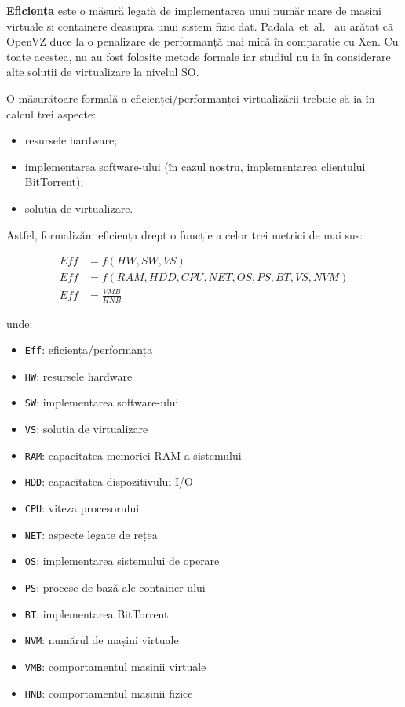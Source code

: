 \textbf{Eficiența} este o măsură legată de implementarea unui număr mare
de mașini virtuale și containere deasupra unui sistem fizic dat.
Padala~et~al.~\cite{eval-virt-performance} au arătat că OpenVZ duce la
o penalizare de performanță mai mică în comparație cu Xen. Cu toate acestea,
nu au fost folosite metode formale iar studiul nu ia în considerare alte
soluții de virtualizare la nivelul SO.

O măsurătoare formală a eficienței/performanței virtualizării trebuie să
ia în calcul trei aspecte:

\begin{itemize}
  \item resursele hardware;
  \item implementarea software-ului (în cazul nostru, implementarea
  clientului BitTorrent);
  \item soluția de virtualizare.
\end{itemize}

Astfel, formalizăm eficiența drept o funcție a celor trei metrici de mai sus:

\begin{align}
Eff & = f(HW, SW, VS)\\
Eff & = f(RAM, HDD, CPU, NET, OS, PS, BT, VS, NVM)\\
Eff &= \frac{VMB}{HNB}
\end{align}

unde:

\begin{multicols}{2}
    \begin{itemize}
      \item \texttt{Eff}: eficiența/performanța
      \item \texttt{HW}: resursele hardware
      \item \texttt{SW}: implementarea software-ului
      \item \texttt{VS}: soluția de virtualizare
      \item \texttt{RAM}: capacitatea memoriei RAM a sistemului
      \item \texttt{HDD}: capacitatea dispozitivului I/O
      \item \texttt{CPU}: viteza procesorului
      \item \texttt{NET}: aspecte legate de rețea
      \item \texttt{OS}: implementarea sistemului de operare
      \item \texttt{PS}: procese de bază ale container-ului
      \item \texttt{BT}: implementarea BitTorrent
      \item \texttt{NVM}: numărul de mașini virtuale
      \item \texttt{VMB}: comportamentul mașinii virtuale
      \item \texttt{HNB}: comportamentul mașinii fizice
    \end{itemize}
\end{multicols}

